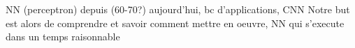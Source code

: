 \startsubject[title=Introduction]
NN (perceptron) depuis (60-70?) aujourd'hui, bc d'applications, CNN
Notre but est alors de comprendre et savoir comment mettre en oeuvre, NN qui s'execute dans un temps raisonnable
\stopsubject